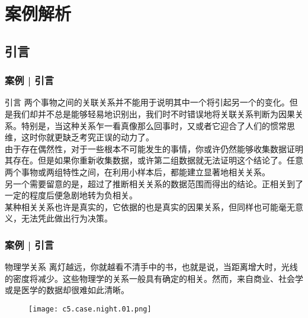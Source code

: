 \section{案例解析}
\subsection{引言}
\begin{frame}
  \frametitle{案例 | 引言}
  \begin{block}{引言}
两个事物之间的关联关系并不能用于说明其中一个将引起另一个的变化。但是我们却并不总是能够轻易地识别出，我们时不时错误地将关联关系判断为因果关系。特别是，当这种关系乍一看真像那么回事时，又或者它迎合了人们的惯常思维，这时你就更缺乏考究正误的动力了。\\
\vspace{0.5em}
由于存在偶然性，对于一些根本不可能发生的事情，你或许仍然能够收集数据证明其存在。但是如果你重新收集数据，或许第二组数据就无法证明这个结论了。\alert{任意两个事物或两组特性之间，在利用小样本后，都能建立显著地相关关系。}\\
\vspace{0.5em}
另一个需要留意的是，超过了推断相关关系的数据范围而得出的结论。正相关到了一定的程度后便急剧地转为负相关。\\
\vspace{0.5em}
某种相关关系也许是真实的，它依据的也是真实的因果关系，但同样也可能毫无意义，无法凭此做出行为决策。
  \end{block}
\end{frame}

\begin{frame}
  \frametitle{案例 | 引言}
  \begin{block}{物理学关系}
离灯越远，你就越看不清手中的书，也就是说，当距离增大时，光线的密度将减少。这些物理学的关系一般具有确定的相关。然而，来自商业、社会学或是医学的数据却很难如此清晰。
  \end{block}
  \vspace{-0.5em}
  \begin{figure}
    \centering
    \texttt{[image: c5.case.night.01.png]}
  \end{figure}
\end{frame}

